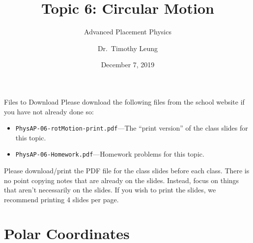 \documentclass[12pt,compress,aspectratio=169]{beamer}
\title{Topic 6: Circular Motion}
\subtitle{Advanced Placement Physics}
\author[TML]{Dr.\ Timothy Leung}
\institute{Olympiads School}
\date{December 7, 2019}
\begin{document}
\begin{frame}
  \maketitle
\end{frame}


\begin{frame}{Files to Download}
  Please download the following files from the school website if you have not
  already done so:
  \begin{itemize}
  \item\texttt{PhysAP-06-rotMotion-print.pdf}---The ``print version'' of the
    class slides for this topic.
  \item\texttt{PhysAP-06-Homework.pdf}---Homework problems for this topic.
  \end{itemize}
  \vspace{.1in}Please download/print the PDF file for the class slides before
  each class. There is no point copying notes that are already on the slides.
  Instead, focus on things that aren't necessarily on the slides. If you wish
  to print the slides, we recommend printing 4 slides per page.
\end{frame}



\section{Polar Coordinates}
\end{document}
